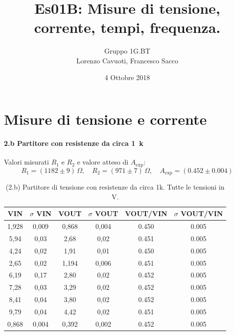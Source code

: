 \documentclass[10pt,a4paper]{article}
\author{Gruppo 1G.BT \\ Lorenzo Cavuoti, Francesco Sacco}
\title{Es01B: Misure di tensione, corrente, tempi, frequenza.}
\newcommand{\exn}{\phantom{xxx}}
\begin{document}
\date{4 Ottobre 2018}
\maketitle

\setcounter{section}{1}
\section{Misure di tensione e corrente}

\paragraph{2.b Partitore con resistenze da circa 1~k}
Valori misurati $R_1$ e $R_2$ e valore atteso di $A_\mathrm{exp}$:
\[
R_1 = (1182 \pm 9) \,\Omega, \quad
R_2 = (971 \pm 7) \,\Omega, \quad
A_\mathrm{exp} = ( 0.452 \pm 0.004 ) 
\]


\begin{table}[h]
\centering
\begin{tabular}{|c|c|c|c|c|c|}
\hline 
VIN& $\sigma$ VIN  &VOUT	 & $\sigma$ VOUT& VOUT/VIN & $\sigma$ VOUT/VIN \\
\hline 
1,928 & 0,009 & 0,868 & 0,004 & 0.450 &\exn 0.005 \\
5,94 & 0,03 & 2,68 & 0,02 & 0.451 &\exn 0.005 \\
4,24 & 0,02 & 1,91 & 0,01 & 0.450 &\exn 0.005 \\
2,65 & 0,02 & 1,194 & 0,006 & 0.451 &\exn 0.005 \\
6,19 & 0,17 & 2,80 & 0,02 & 0.452 &\exn 0.005 \\
7,28 & 0,03 & 3,29 & 0,02 & 0.452 &\exn 0.005 \\
8,41 & 0,04 & 3,80 & 0,02 & 0.452 &\exn 0.005 \\
9,79 & 0,04 & 4,42 & 0,02 & 0.451 &\exn 0.005 \\
0,868 & 0,004 & 0,392 & 0,002 & 0.452 &\exn 0.005 \\
\hline 
\end{tabular} 
\caption{(2.b) Partitore di tensione con resistenze da circa 1k. Tutte le tensioni in V.\label{t:par1}}
\end{table}
\end{document}
